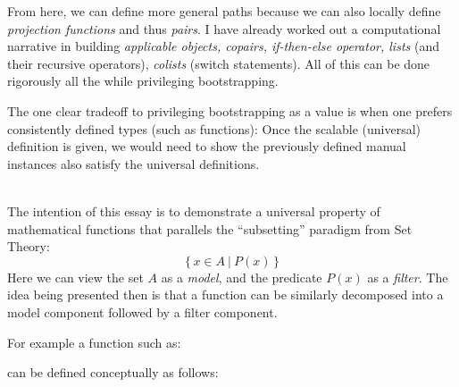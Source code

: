 \documentclass[twoside]{article}
\begin{document}
From here, we can define more general paths because we can also locally define \emph{projection functions} and thus
\emph{pairs}.  I have already worked out a computational narrative in building \emph{applicable objects, copairs,
if-then-else operator, lists} (and their recursive operators), \emph{colists} (switch statements). All of this can
be done rigorously all the while privileging bootstrapping.

The one clear tradeoff to privileging bootstrapping as a value is when one prefers consistently defined types (such
as functions): Once the scalable (universal) definition is given, we would need to show the previously defined
manual instances also satisfy the universal definitions.

\ \\[0.5cm]

The intention of this essay is to demonstrate a universal property of mathematical functions
that parallels the ``subsetting'' paradigm from Set Theory:
$$ \{\,x\in A\ |\ P(x)\,\} $$
Here we can view the set $ A $ as a \emph{model}, and the predicate $ P(x) $ as a \emph{filter}. The idea being
presented then is that a function can be similarly decomposed into a model component followed by a filter component.

For example a function such as:

can be defined conceptually as follows:
\end{document}
